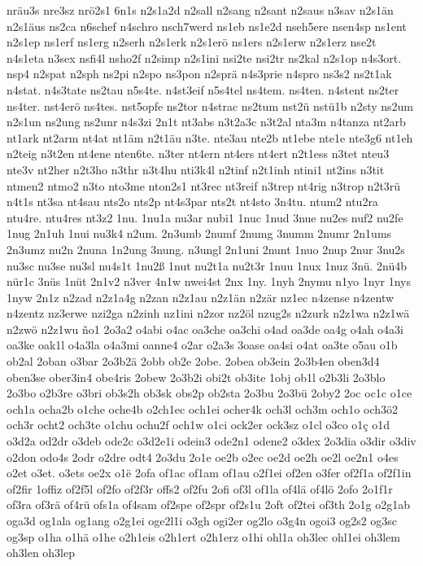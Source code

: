 {nräu3s
nre3sz
nrö2s1
6n1s
n2s1a2d
n2sall
n2sang
n2sant
n2saus
n3sav
n2s1än
n2s1äus
ns2ca
n6schef
n4schro
nsch7werd
ns1eb
ns1e2d
nseh5ere
nsen4sp
ns1ent
n2s1ep
ns1erf
ns1erg
n2serh
n2s1erk
n2s1erö
ns1ers
n2s1erw
n2s1erz
nse2t
n4s1eta
n3sex
nsfi4l
nsho2f
n2simp
n2s1ini
nsi2te
nsi2tr
ns2kal
n2s1op
n4s3ort.
nsp4
n2spat
n2sph
ns2pi
n2spo
ns3pon
n2sprä
n4s3prie
n4spro
ns3s2
ns2t1ak
n4stat.
n4s3tate
ns2tau
n5s4te.
n4st3eif
n5s4tel
ns4tem.
ns4ten.
n4stent
ns2ter
ns4ter.
nst4erö
ns4tes.
nst5opfe
ns2tor
n4strac
ns2tum
nst2ü
nstü1b
n2sty
ns2um
n2s1un
ns2ung
ns2unr
n4s3zi
2n1t
nt3abs
n3t2a3c
n3t2al
nta3m
n4tanza
nt2arb
nt1ark
nt2arm
nt4at
nt1äm
n2t1äu
n3te.
nte3au
nte2b
nt1ebe
nte1e
nte3g6
nt1eh
n2teig
n3t2en
nt4ene
nten6te.
n3ter
nt4ern
nt4ers
nt4ert
n2t1ess
n3tet
nteu3
nte3v
nt2her
n2t3ho
n3thr
n3t4hu
nti3k4l
n2tinf
n2t1inh
ntini1
nt2ins
n3tit
ntmen2
ntmo2
n3to
nto3me
nton2s1
nt3rec
nt3reif
n3trep
nt4rig
n3trop
n2t3rü
n4t1s
nt3sa
nt4sau
nts2o
nts2p
nt4s3par
nts2t
nt4sto
3n4tu.
ntum2
ntu2ra
ntu4re.
ntu4res
nt3z2
1nu.
1nu1a
nu3ar
nubi1
1nuc
1nud
3nue
nu2es
nuf2
nu2fe
1nug
2n1uh
1nui
nu3k4
n2um.
2n3umb
2numf
2numg
3numm
2numr
2n1ums
2n3umz
nu2n
2nuna
1n2ung
3nung.
n3ungl
2n1uni
2nunt
1nuo
2nup
2nur
3nu2s
nu3sc
nu3se
nu3sl
nu4s1t
1nu2ß
1nut
nu2t1a
nu2t3r
1nuu
1nux
1nuz
3nü.
2nü4b
nür1c
3nüs
1nüt
2n1v2
n3ver
4n1w
nwei4st
2nx
1ny.
1nyh
2nymu
n1yo
1nyr
1nys
1nyw
2n1z
n2zad
n2z1a4g
n2zan
n2z1au
n2z1än
n2zär
nz1ec
n4zense
n4zentw
n4zentz
nz3erwe
nzi2ga
n2zinh
nz1ini
n2zor
nz2öl
nzug2s
n2zurk
n2z1wa
n2z1wä
n2zwö
n2z1wu
ño1
2o3a2
o4abi
o4ac
oa3che
oa3chi
o4ad
oa3de
oa4g
o4ah
o4a3i
oa3ke
oak1l
o4a3la
o4a3mi
oanne4
o2ar
o2a3s
3oase
oa4si
o4at
oa3te
o5au
o1b
ob2al
2oban
o3bar
2o3b2ä
2obb
ob2e
2obe.
2obea
ob3ein
2o3b4en
oben3d4
oben3se
ober3in4
obe4ris
2obew
2o3b2i
obi2t
ob3ite
1obj
ob1l
o2b3li
2o3blo
2o3bo
o2b3re
o3bri
ob3s2h
ob3sk
obs2p
ob2sta
2o3bu
2o3bü
2oby2
2oc
oc1c
o1ce
och1a
ocha2b
o1che
oche4b
o2ch1ec
och1ei
ocher4k
och3l
och3m
och1o
och3ö2
och3r
ocht2
och3te
o1chu
ochu2f
och1w
o1ci
ock2er
ock3sz
o1cl
o3co
o1ç
o1d
o3d2a
od2dr
o3deb
ode2c
o3d2e1i
odein3
ode2n1
odene2
o3dex
2o3dia
o3dir
o3div
o2don
odo4s
2odr
o2dre
odt4
2o3du
2o1e
oe2b
o2ec
oe2d
oe2h
oe2l
oe2n1
o4es
o2et
o3et.
o3ets
oe2x
o1ë
2ofa
of1ac
of1am
of1au
o2f1ei
of2en
o3fer
of2f1a
of2f1in
of2fir
1offiz
of2f5l
of2fo
of2f3r
offs2
of2fu
2ofi
of3l
of1la
of4lä
of4lö
2ofo
2o1f1r
of3ra
of3rä
of4rü
ofs1a
of4sam
of2spe
of2spr
of2s1u
2oft
of2tei
of3th
2o1g
o2g1ab
oga3d
og1ala
og1ang
o2g1ei
oge2l1i
o3gh
ogi2er
og2lo
o3g4n
ogoi3
og2s2
og3sc
og3sp
o1ha
o1hä
o1he
o2h1eis
o2h1ert
o2h1erz
o1hi
ohl1a
oh3lec
ohl1ei
oh3lem
oh3len
oh3lep
}
